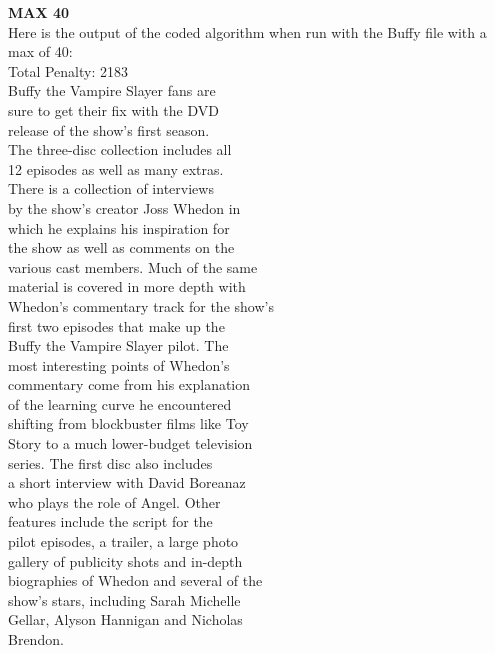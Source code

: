 \documentclass[11pt, solution, letterpaper]{format}
\begin{document}
\textbf{MAX 40}\\
Here is the output of the coded algorithm when run with the Buffy file with a max of 40:\\

Total Penalty: 2183\\
Buffy the Vampire Slayer fans are\\ 
sure to get their fix with the DVD\\
release of the show's first season.\\
The three-disc collection includes all\\ 
12 episodes as well as many extras.\\
There is a collection of interviews\\
by the show's creator Joss Whedon in\\
which he explains his inspiration for\\
the show as well as comments on the\\
various cast members. Much of the same\\
material is covered in more depth with\\
Whedon's commentary track for the show's\\
first two episodes that make up the\\
Buffy the Vampire Slayer pilot. The\\
most interesting points of Whedon's\\
commentary come from his explanation\\
of the learning curve he encountered\\
shifting from blockbuster films like Toy\\ 
Story to a much lower-budget television\\
series. The first disc also includes\\
a short interview with David Boreanaz\\
who plays the role of Angel. Other\\
features include the script for the\\
pilot episodes, a trailer, a large photo\\
gallery of publicity shots and in-depth\\
biographies of Whedon and several of the\\
show's stars, including Sarah Michelle\\
Gellar, Alyson Hannigan and Nicholas\\
Brendon.  \\
\end{document}
